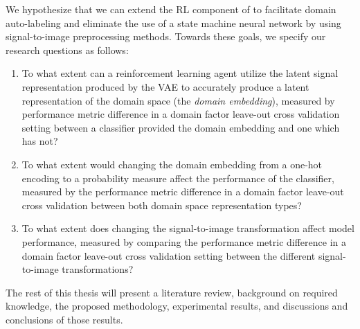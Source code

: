 We hypothesize that we can extend the RL component of \cite{ma2021location} to facilitate domain auto-labeling and eliminate the use of a state machine neural network by using signal-to-image preprocessing methods.
Towards these goals, we specify our research questions as follows:

\begin{enumerate}
	\item To what extent can a reinforcement learning agent utilize the latent signal representation produced by the VAE to accurately produce a latent representation of the domain space (the \textit{domain embedding}), measured by performance metric difference in a domain factor leave-out cross validation setting between a classifier provided the domain embedding and one which has not?
	\item To what extent would changing the domain embedding from a one-hot encoding to a probability measure affect the performance of the classifier, measured by the performance metric difference in a domain factor leave-out cross validation between both domain space representation types?
	\item To what extent does changing the signal-to-image transformation affect model performance, measured by comparing the performance metric difference in a domain factor leave-out cross validation setting between the different signal-to-image transformations?
\end{enumerate}

The rest of this thesis will present a literature review, background on required knowledge, the proposed methodology, experimental results, and discussions and conclusions of those results.